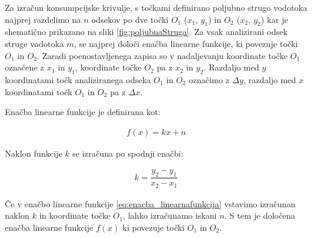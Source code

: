 Za izračun konsumpcijske krivulje, s točkami definirano poljubno strugo vodotoka najprej razdelimo na $n$ odsekov po dve točki $O_1$ ($x_1$, $y_1$) in $O_2$ ($x_2$, $y_2$) kar je shematično prikazano na sliki \ref{fig:poljubnaStruga}. Za vsak analizirani odsek struge vodotoka $m$, se najprej določi enačba linearne funkcije, ki povezuje točki $O_1$ in $O_2$.  Zaradi poenostavljenega zapisa so v nadaljevanju koordinate točke $O_1$ označene z $x_1$ in $y_1$, koordinate točke $O_2$ pa z $x_2$ in $y_2$. Razdaljo med $y$ koordinatami točk analiziranega odseka $O_1$ in $O_2$ označimo z $\Delta y$, razdaljo med $x$ koordinatami točk $O_1$ in $O_2$ pa z $\Delta x$.


Enačba linearne funkcije je definirana kot:
\begin{ceqn}
\begin{align}
f(x) = kx + n \label{eq:enacba_linearnafunkcija}
\end{align}
\end{ceqn}

Naklon funkcije $k$ se izračuna po spodnji enačbi:

\begin{ceqn}
\begin{align}
k = \dfrac{y_2 - y_1}{x_2 - x_1}
\end{align}
\end{ceqn}



Če v enačbo linearne funkcije \ref{eq:enacba_linearnafunkcija} vstavimo izračunan naklon $k$ in koordinate točke $O_1$, lahko izračunamo iskani $n$. S tem je določena enačba linearne funkcije $f(x)$ ki povezuje točki $O_1$ in $O_2$.

